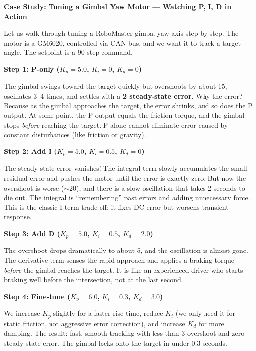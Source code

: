 \vspace{0.5em}
\begin{mdframed}[linewidth=1pt, innertopmargin=10pt, innerbottommargin=10pt]
\textbf{Case Study: Tuning a Gimbal Yaw Motor --- Watching P, I, D in Action}

\vspace{0.3em}
Let us walk through tuning a RoboMaster gimbal yaw axis step by step. The motor is a GM6020, controlled via CAN bus, and we want it to track a target angle. The setpoint is a 90\textdegree{} step command.

\textbf{Step 1: P-only ($K_p = 5.0$, $K_i = 0$, $K_d = 0$)}

The gimbal swings toward the target quickly but overshoots by about 15\textdegree{}, oscillates 3--4 times, and settles with a \textbf{2\textdegree{} steady-state error}. Why the error? Because as the gimbal approaches the target, the error shrinks, and so does the P output. At some point, the P output equals the friction torque, and the gimbal stops \textit{before} reaching the target. P alone cannot eliminate error caused by constant disturbances (like friction or gravity).

\textbf{Step 2: Add I ($K_p = 5.0$, $K_i = 0.5$, $K_d = 0$)}

The steady-state error vanishes! The integral term slowly accumulates the small residual error and pushes the motor until the error is exactly zero. But now the overshoot is worse (${\sim}$20\textdegree{}), and there is a slow oscillation that takes 2 seconds to die out. The integral is ``remembering'' past errors and adding unnecessary force. This is the classic I-term trade-off: it fixes DC error but worsens transient response.

\textbf{Step 3: Add D ($K_p = 5.0$, $K_i = 0.5$, $K_d = 2.0$)}

The overshoot drops dramatically to about 5\textdegree{}, and the oscillation is almost gone. The derivative term senses the rapid approach and applies a braking torque \textit{before} the gimbal reaches the target. It is like an experienced driver who starts braking well before the intersection, not at the last second.

\textbf{Step 4: Fine-tune ($K_p = 6.0$, $K_i = 0.3$, $K_d = 3.0$)}

We increase $K_p$ slightly for a faster rise time, reduce $K_i$ (we only need it for static friction, not aggressive error correction), and increase $K_d$ for more damping. The result: fast, smooth tracking with less than 3\textdegree{} overshoot and zero steady-state error. The gimbal locks onto the target in under 0.3 seconds.


\end{mdframed}
